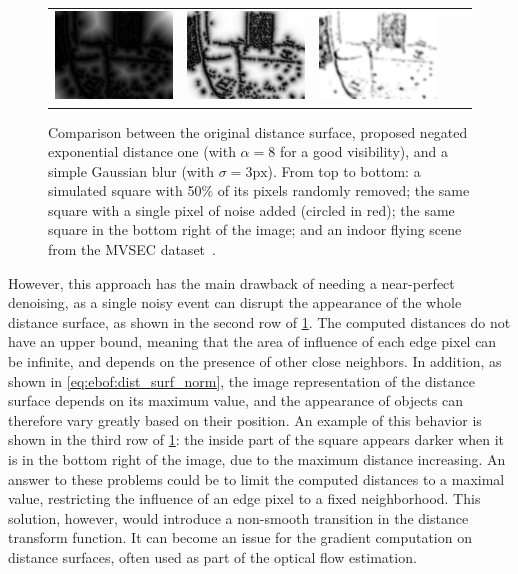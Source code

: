 \begin{figure}[t]
\begin{tabular}{@{}ccccc@{}}
    \includegraphics[width=0.22\linewidth]{mainmatter/figures/3_optical_flow/distance_surface/indoor_flying_orig_ds.png} &
    \includegraphics[width=0.22\linewidth]{mainmatter/figures/3_optical_flow/distance_surface/indoor_flying_exp_ds.png} &
    \includegraphics[width=0.22\linewidth]{mainmatter/figures/3_optical_flow/distance_surface/indoor_flying_gauss.png} \\
  \end{tabular}
  \caption{Comparison between the original distance surface, proposed negated exponential distance one (with \(\alpha=8\) for a good visibility), and a simple Gaussian blur (with \(\sigma=3\text{px}\)). From top to bottom: a simulated square with 50\% of its pixels randomly removed; the same square with a single pixel of noise added (circled in red); the same square in the bottom right of the image; and an indoor flying scene from the MVSEC dataset~\cite{Zhu2018TheMS}.}\label{fig:ebof:distance_surfaces}
\end{figure}

However, this approach has the main drawback of needing a near-perfect denoising, as a single noisy event can disrupt the appearance of the whole distance surface, as shown in the second row of \cref{fig:ebof:distance_surfaces}. The computed distances do not have an upper bound, meaning that the area of influence of each edge pixel can be infinite, and depends on the presence of other close neighbors. In addition, as shown in \cref{eq:ebof:dist_surf_norm}, the image representation of the distance surface depends on its maximum value, and the appearance of objects can therefore vary greatly based on their position. An example of this behavior is shown in the third row of \cref{fig:ebof:distance_surfaces}: the inside part of the square appears darker when it is in the bottom right of the image, due to the maximum distance increasing. An answer to these problems could be to limit the computed distances to a maximal value, restricting the influence of an edge pixel to a fixed neighborhood. This solution, however, would introduce a non-smooth transition in the distance transform function. It can become an issue for the gradient computation on distance surfaces, often used as part of the optical flow estimation.

